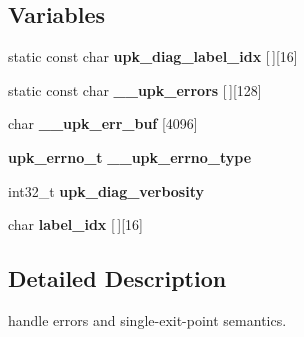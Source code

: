 \subsection*{Variables}
\begin{DoxyCompactItemize}
\item 
static const char {\bf upk\_\-diag\_\-label\_\-idx} [$\,$][16]
\item 
static const char {\bf \_\-\_\-upk\_\-errors} [$\,$][128]
\item 
char {\bf \_\-\_\-upk\_\-err\_\-buf} [4096]
\item 
{\bf upk\_\-errno\_\-t} {\bf \_\-\_\-upk\_\-errno\_\-type}
\item 
int32\_\-t {\bf upk\_\-diag\_\-verbosity}
\item 
char {\bf label\_\-idx} [$\,$][16]
\end{DoxyCompactItemize}


\subsection{Detailed Description}
handle errors and single-\/exit-\/point semantics. 
